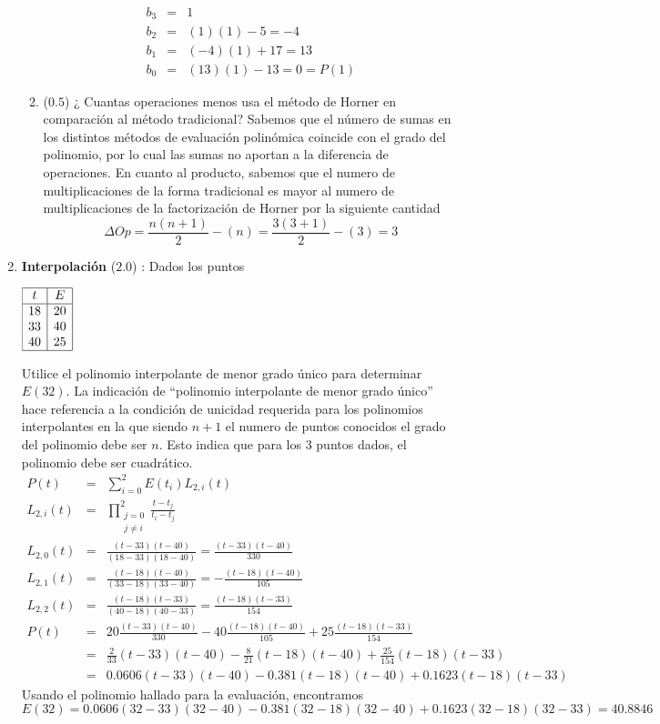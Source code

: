 \documentclass[12pt]{article}
\begin{document}
\begin{enumerate}[leftmargin=*,widest=9]
\begin{enumerate}[label=\alph*]
\begin{eqnarray*}
b_3 & = & 1 \\
b_2 & = & (1)(1) - 5 = -4\\
b_1 & = & (-4)(1) + 17 = 13\\
b_0 & = & (13)(1) - 13 = 0 = P(1)
\end{eqnarray*}
\item ($0.5$) ¿ Cuantas operaciones menos usa el método de Horner en comparación al método tradicional?
Sabemos que el número de sumas en los distintos métodos de evaluación polinómica coincide con el grado del polinomio, por lo cual las sumas no aportan a la diferencia de operaciones. En cuanto al producto, sabemos que el numero de multiplicaciones de la forma tradicional es mayor al numero de multiplicaciones de la factorización de Horner por la siguiente cantidad
\[ \Delta Op = \frac{n(n+1)}{2} - (n) = \frac{3(3+1)}{2} - (3) = 3 \]
    \end{enumerate}
    \item \textbf{Interpolación} ($2.0$) : Dados los puntos
    \begin{center}
    \(
    \begin{array}{|c|c|}
    \hline
    t & E \\
    \hline
    18 & 20 \\
    33 & 40\\
    40 & 25\\
    \hline
    \end{array}
    \)
    \end{center}
    Utilice el polinomio interpolante de menor grado único para determinar \(E(32)\).
    La indicación de ``polinomio interpolante de menor grado único'' hace referencia a la condición de unicidad requerida para los polinomios interpolantes en la que siendo \(n+1\) el numero de puntos conocidos el grado del polinomio debe ser \(n\). Esto indica que para los 3 puntos dados, el polinomio debe ser cuadrático.
    \begin{eqnarray*}
    P(t) & = & \sum_{i=0}^2 E(t_i) L_{2, i}(t) \\
    L_{2, i}(t) & = & \prod_{\substack{j=0 \\ j \neq i}}^{2} \frac{t-t_j}{t_i - t_j}\\
    L_{2, 0}(t) & = & \frac{(t-33)(t-40)}{(18-33)(18-40)} = \frac{(t-33)(t-40)}{330}\\
    L_{2, 1}(t) & = & \frac{(t-18)(t-40)}{(33-18)(33-40)} = -\frac{(t-18)(t-40)}{105}\\
    L_{2, 2}(t) & = & \frac{(t-18)(t-33)}{(40-18)(40-33)} = \frac{(t-18)(t-33)}{154}\\
    P(t) & = & 20 \frac{(t-33)(t-40)}{330} - 40 \frac{(t-18)(t-40)}{105} + 25 \frac{(t-18)(t-33)}{154}\\
    & = & \frac{2}{33}(t-33)(t-40) - \frac{8}{21}(t-18)(t-40) +  \frac{25}{154}(t-18)(t-33)\\
    & = & 0.0606(t-33)(t-40) - 0.381(t-18)(t-40) +  0.1623(t-18)(t-33)
    \end{eqnarray*}
    Usando el polinomio hallado para la evaluación, encontramos
    \[ E(32) = 0.0606(32-33)(32-40) - 0.381(32-18)(32-40) +  0.1623(32-18)(32-33) = 40.8846 \]
  \end{enumerate}
\end{document}
